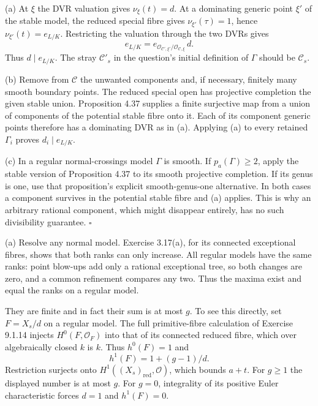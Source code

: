 \documentclass[11pt]{article}
\let\chapterexercise\exercise
\renewcommand{\exercise}[2]{\Needspace{8\baselineskip}\chapterexercise{#1}{#2}}
\begin{document}
\pf (a) At $\xi$ the DVR valuation gives $\nu_\xi(t)=d$. At a dominating generic point $\xi'$ of the stable model, the reduced special fibre gives $\nu_{\xi'}(\tau)=1$, hence $\nu_{\xi'}(t)=e_{L/K}$. Restricting the valuation through the two DVRs gives
\[ e_{L/K}=e_{\mathcal O_{\mathcal C',\xi'}/\mathcal O_{\mathcal C,\xi}}\,d. \]
Thus $d\mid e_{L/K}$. The stray $\mathcal C'_s$ in the question's initial definition of $\Gamma$ should be $\mathcal C_s$.

(b) Remove from $\mathcal C$ the unwanted components and, if necessary, finitely many smooth boundary points. The reduced special open has projective completion the given stable union. Proposition 4.37 supplies a finite surjective map from a union of components of the potential stable fibre onto it. Each of its component generic points therefore has a dominating DVR as in (a). Applying (a) to every retained $\Gamma_i$ proves $d_i\mid e_{L/K}$.

(c) In a regular normal-crossings model $\Gamma$ is smooth. If $p_a(\Gamma)\ge2$, apply the stable version of Proposition 4.37 to its smooth projective completion. If its genus is one, use that proposition's explicit smooth-genus-one alternative. In both cases a component survives in the potential stable fibre and (a) applies. This is why an arbitrary rational component, which might disappear entirely, has no such divisibility guarantee. \hfill$\square$

\pf (a) Resolve any normal model. Exercise 3.17(a), for its connected exceptional fibres, shows that both ranks can only increase. All regular models have the same ranks: point blow-ups add only a rational exceptional tree, so both changes are zero, and a common refinement compares any two. Thus the maxima exist and equal the ranks on a regular model.

They are finite and in fact their sum is at most $g$. To see this directly, set $F=X_s/d$ on a regular model. The full primitive-fibre calculation of Exercise 9.1.14 injects $H^0(F,\mathcal O_F)$ into that of its connected reduced fibre, which over algebraically closed $k$ is $k$. Thus $h^0(F)=1$ and
\[ h^1(F)=1+(g-1)/d. \]
Restriction surjects onto $H^1((X_s)_{\mathrm{red}},\mathcal O)$, which bounds $a+t$. For $g\ge1$ the displayed number is at most $g$. For $g=0$, integrality of its positive Euler characteristic forces $d=1$ and $h^1(F)=0$.
\end{document}
